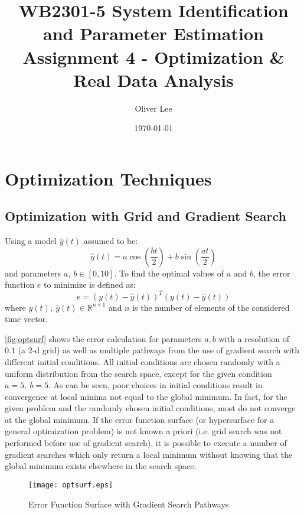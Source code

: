 \documentclass[11pt,a4paper]{article}
\title{WB2301-5 System Identification and Parameter Estimation \\
Assignment 4 - Optimization \& Real Data Analysis}
\author{Oliver Lee}
\date{\today}
\begin{document}
\maketitle

\section{Optimization Techniques}

\subsection{Optimization with Grid and Gradient Search}
Using a model $ \hat{y}(t) $ assumed to be:
\begin{equation*}
    \hat{y}(t) = a\cos(\frac{bt}{2}) + b\sin(\frac{at}{2})
\end{equation*}
and parameters $ a,\: b \in [0, 10] $. To find the optimal values of $a$ and
$b$, the error function $e$ to minimize is defined as:
\begin{equation*}
    e = (y(t) - \hat{y}(t))^T (y(t) - \hat{y}(t))
\end{equation*}
where $y(t),\: \hat{y}(t) \in \mathbb{R}^{n \times 1} $ and $n$ is the number
of elements of the considered time vector.

\autoref{fig:optsurf} shows the error calculation for parameters $a, b$ with a
resolution of $0.1$ (a 2-d grid) as well as multiple pathways from the use of
gradient search with different initial conditions. All initial conditions are
chosen randomly with a uniform distribution from the search space, except for
the given condition $a = 5, \: b = 5$. As can be seen, poor choices in initial
conditions result in convergence at local minima not equal to the global
minimum. In fact, for the given problem and the randomly chosen initial
conditions, most do not converge at the global minimum.  If the error function
surface (or hypersurface for a general optimization problem) is not known a
priori (i.e. grid search was not performed before use of gradient search), it
is possible to execute a number of gradient searches which only return a local
minimum without knowing that the global minimum exists elsewhere in the search
space.

\begin{figure}
    \centering
    \texttt{[image: optsurf.eps]}
    \caption{Error Function Surface with Gradient Search Pathways}
    \label{fig:optsurf}
\end{figure}
\end{document}
